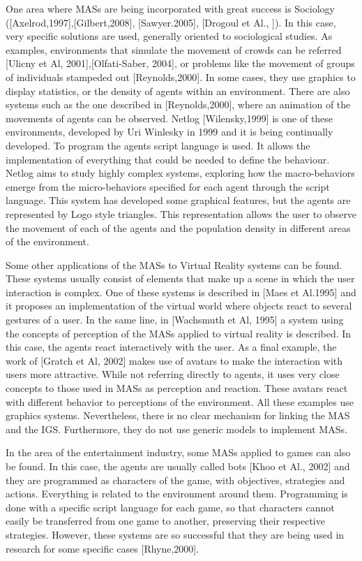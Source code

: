 \documentclass[runningheads]{llncs}
\begin{document}
One area where MASs are being incorporated with great success is Sociology ([Axelrod,1997],[Gilbert,2008], [Sawyer.2005], [Drogoul et Al., ]). In this case, very specific solutions are used, generally oriented to sociological studies. As examples, environments that simulate the movement of crowds can be referred [Ulicny et Al, 2001],[Olfati-Saber, 2004], or problems like the movement of groups of individuals stampeded out [Reynolds,2000]. In some cases, they use graphics to display statistics, or the density of agents within an environment. There are also systems such as the one described in [Reynolds,2000], where an animation of the movements of agents can be observed. Netlog [Wilensky,1999] is one of these environments, developed by Uri Winlesky in 1999 and it is being continually developed. To program the agents script language is used. It allows the implementation of everything that could be needed to define the behaviour. Netlog aims to study highly complex systems, exploring how the macro-behaviors emerge from the micro-behaviors specified for each agent through the script language. This system has developed some graphical features, but the agents are represented by Logo style triangles. This representation allows the user to observe the movement of each of the agents and the population density in different areas of the environment.

Some other applications of the MASs to Virtual Reality systems can be found. These systems usually consist of elements that make up a scene in which the user interaction is complex. One of these systems is described in [Maes et Al.1995] and it proposes an implementation of the virtual world where objects react to several gestures of a user. In the same line, in [Wachsmuth et Al, 1995] a system using the concepts of perception of the MASs applied to virtual reality is described. In this case, the agents react interactively with the user. As a final example, the work of [Gratch et Al, 2002] makes use of avatars to make the interaction with users more attractive. While not referring directly to agents, it uses very close concepts to those used in MASs as perception and reaction. These avatars react with different behavior to perceptions of the environment. All these examples use graphics systems. Nevertheless, there is no clear mechanism for linking the MAS and the IGS. Furthermore, they do not use generic models to implement MASs.

In the area of the entertainment industry, some MASs applied to games can also be found. In this case, the agents are usually called bots [Khoo et Al., 2002] and they are programmed as characters of the game, with objectives, strategies and actions. Everything is related to the environment around them. Programming is done with a specific script language for each game, so that characters cannot easily be transferred from one game to another, preserving their respective strategies. However, these systems are so successful that they are being used in research for some specific cases [Rhyne,2000]. 
\end{document}
